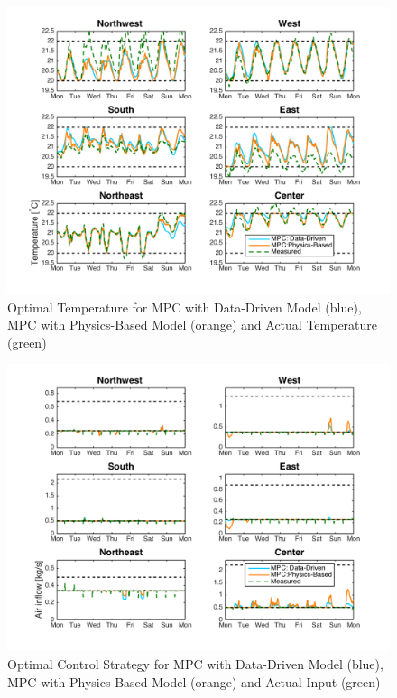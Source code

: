 \begin{figure}
\centering
\vspace*{-0.4cm}
\includegraphics[width=\textwidth]{chapters/building_model/figures/Comparison_Temp.png}
\vspace*{-0.5cm}
\caption{Optimal Temperature for MPC with Data-Driven Model (blue), MPC with Physics-Based Model (orange) and Actual Temperature (green)}
\vspace*{-0.2cm}
\label{fig:MPC_comparison_temp}
\end{figure}

\begin{figure}
\centering
\includegraphics[width=\textwidth]{chapters/building_model/figures/Comparison_Flow.png}
\vspace*{-0.5cm}
\caption{Optimal Control Strategy for MPC with Data-Driven Model (blue), MPC with Physics-Based Model (orange) and Actual Input (green)}
\label{fig:MPC_comparison_flow}
\end{figure}

